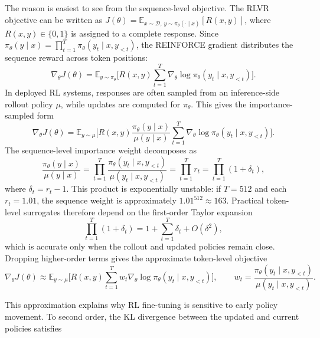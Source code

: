 The reason is easiest to see from the sequence-level objective. The RLVR objective can be
written as \(J(\theta)=\mathbb{E}_{x\sim\mathcal{D},\,y\sim\pi_\theta(\cdot\mid x)}[R(x,y)]\),
where \(R(x,y)\in\{0,1\}\) is assigned to a complete response. Since
\(\pi_\theta(y\mid x)=\prod_{t=1}^{T}\pi_\theta(y_t\mid x,y_{<t})\), the REINFORCE
gradient \citep{williams1992reinforce} distributes the sequence reward across token positions:
\[
    \nabla_\theta J(\theta)
    =
    \mathbb{E}_{y\sim\pi_\theta}
    \biggl[
        R(x,y)
        \sum_{t=1}^{T}
        \nabla_\theta \log \pi_\theta(y_t\mid x,y_{<t})
    \biggr].
\]
In deployed RL systems, responses are often sampled from an inference-side rollout policy
\(\mu\), while updates are computed for \(\pi_\theta\). This gives the importance-sampled form
\[
    \nabla_\theta J(\theta)
    =
    \mathbb{E}_{y\sim\mu}
    \biggl[
        R(x,y)
        \frac{\pi_\theta(y\mid x)}{\mu(y\mid x)}
        \sum_{t=1}^{T}
        \nabla_\theta \log \pi_\theta(y_t\mid x,y_{<t})
    \biggr].
\]
The sequence-level importance weight decomposes as
\[
    \frac{\pi_\theta(y\mid x)}{\mu(y\mid x)}
    =
    \prod_{t=1}^{T}
    \frac{\pi_\theta(y_t\mid x,y_{<t})}
         {\mu(y_t\mid x,y_{<t})}
    =
    \prod_{t=1}^{T}r_t
    =
    \prod_{t=1}^{T}(1+\delta_t),
\]
where \(\delta_t=r_t-1\). This product is exponentially unstable: if \(T=512\) and each
\(r_t=1.01\), the sequence weight is approximately \(1.01^{512}\approx163\). Practical
token-level surrogates therefore depend on the first-order Taylor expansion
\[
    \prod_{t=1}^{T}(1+\delta_t)
    =
    1+\sum_{t=1}^{T}\delta_t
    +
    O(\delta^2),
\]
which is accurate only when the rollout and updated policies remain close. Dropping higher-order
terms gives the approximate token-level objective \citep{zheng2025stabilizingrl}
\[
    \nabla_\theta J(\theta)
    \approx
    \mathbb{E}_{y\sim\mu}
    \biggl[
        R(x,y)
        \sum_{t=1}^{T}
        w_t
        \nabla_\theta \log \pi_\theta(y_t\mid x,y_{<t})
    \biggr],
    \qquad
    w_t=
    \frac{\pi_\theta(y_t\mid x,y_{<t})}
         {\mu(y_t\mid x,y_{<t})}.
\]

This approximation explains why RL fine-tuning is sensitive to early policy movement. To second
order, the KL divergence between the updated and current policies satisfies \citep{zhu2025pathtakenrlvrprovably}

